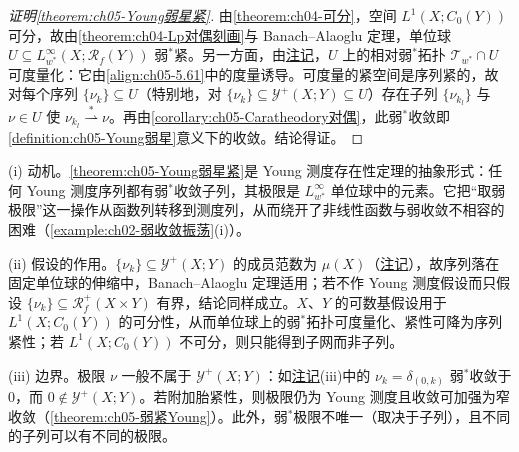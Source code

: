 \documentclass[../../main.tex]{subfiles}%
\begin{document}
\begin{proof}[证明\cref{theorem:ch05-Young弱星紧}]
由\cref{theorem:ch04-可分}，空间 $L^1(X;C_0(Y))$ 可分，故由\cref{theorem:ch04-Lp对偶刻画}与 Banach--Alaoglu 定理，单位球 $U\subseteq L^\infty_{w^*}(X;\mathscr{R}_f(Y))$ 弱$^*$紧。另一方面，由\hyperref[remark:ch05-Young弱星度量]{注记}，$U$ 上的相对弱$^*$拓扑 $\mathcal{T}_{w^*}\cap U$ 可度量化：它由\eqref{align:ch05-5.61}中的度量诱导。可度量的紧空间是序列紧的，故对每个序列 $\{\nu_k\}\subseteq U$（特别地，对 $\{\nu_k\}\subseteq\mathcal{Y}^+(X;Y)\subseteq U$）存在子列 $\{\nu_{k_l}\}$ 与 $\nu\in U$ 使 $\nu_{k_l}\stackrel{*}{\rightharpoonup}\nu$。再由\cref{corollary:ch05-Caratheodory对偶}，此弱$^*$收敛即\cref{definition:ch05-Young弱星}意义下的收敛。结论得证。
\end{proof}

\begin{remark}\label{remark:ch05-Young弱星紧动机}
(i) 动机。\cref{theorem:ch05-Young弱星紧}是 Young 测度存在性定理的抽象形式：任何 Young 测度序列都有弱$^*$收敛子列，其极限是 $L^\infty_{w^*}$ 单位球中的元素。它把“取弱极限”这一操作从函数列转移到测度列，从而绕开了非线性函数与弱收敛不相容的困难（\cref{example:ch02-弱收敛振荡}(i)）。

(ii) 假设的作用。$\{\nu_k\}\subseteq\mathcal{Y}^+(X;Y)$ 的成员范数为 $\mu(X)$（\hyperref[remark:ch02-Young有界]{注记}），故序列落在固定单位球的伸缩中，Banach--Alaoglu 定理适用；若不作 Young 测度假设而只假设 $\{\nu_k\}\subseteq\mathscr{R}^+_f(X\times Y)$ 有界，结论同样成立。$X$、$Y$ 的可数基假设用于 $L^1(X;C_0(Y))$ 的可分性，从而单位球上的弱$^*$拓扑可度量化、紧性可降为序列紧性；若 $L^1(X;C_0(Y))$ 不可分，则只能得到子网而非子列。

(iii) 边界。极限 $\nu$ 一般不属于 $\mathcal{Y}^+(X;Y)$：如\hyperref[remark:ch05-Young弱星动机]{注记}(iii)中的 $\nu_k=\delta_{(0,k)}$ 弱$^*$收敛于 $0$，而 $0\notin\mathcal{Y}^+(X;Y)$。若附加胎紧性，则极限仍为 Young 测度且收敛可加强为窄收敛（\cref{theorem:ch05-弱紧Young}）。此外，弱$^*$极限不唯一（取决于子列），且不同的子列可以有不同的极限。
\end{remark}
\end{document}

